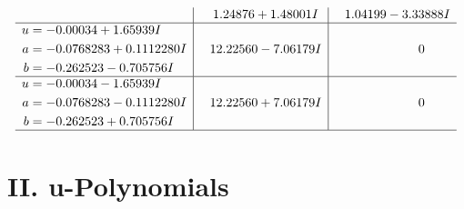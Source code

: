 \documentclass[1p]{elsarticle_modified}
\theoremstyle{definition}
\begin{document}
$$\begin{array}{c|c|c}
 & \phantom{-}1.24876 + 1.48001 I & \phantom{-}1.04199 - 3.33888 I \\ \hline\begin{aligned}
u &= -0.00034 + 1.65939 I \\
a &= -0.0768283 + 0.1112280 I \\
b &= -0.262523 - 0.705756 I\end{aligned}
 & \phantom{-}12.22560 - 7.06179 I & \phantom{-0.000000 } 0 \\ \hline\begin{aligned}
u &= -0.00034 - 1.65939 I \\
a &= -0.0768283 - 0.1112280 I \\
b &= -0.262523 + 0.705756 I\end{aligned}
 & \phantom{-}12.22560 + 7.06179 I & \phantom{-0.000000 } 0\\
 \hline 
 \end{array}$$\newpage
\newpage\renewcommand{\arraystretch}{1}
\centering \section*{ II. u-Polynomials}
\end{document}
